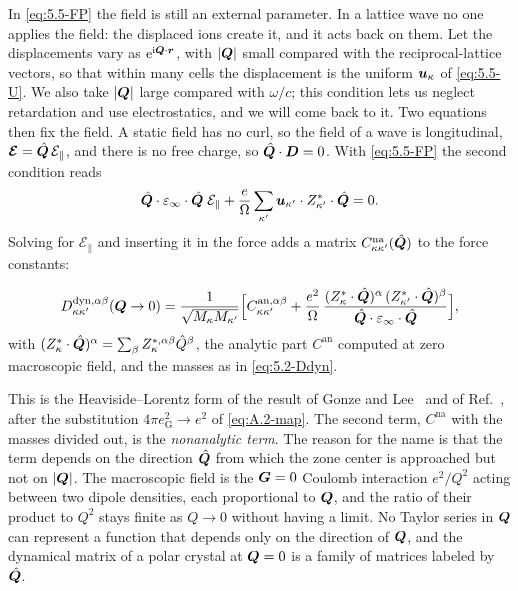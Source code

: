 In \cref{eq:5.5-FP} the field is still an external parameter. In a lattice wave no one applies the field: the displaced ions create it, and it acts back on them. Let the displacements vary as $\mathrm{e}^{\mathrm{i}\bm{Q}\cdot\bm{r}}$, with $|\bm{Q}|$ small compared with the reciprocal-lattice vectors, so that within many cells the displacement is the uniform $\bm{u}_\kappa$ of \cref{eq:5.5-U}. We also take $|\bm{Q}|$ large compared with $\omega/c$; this condition lets us neglect retardation and use electrostatics, and we will come back to it. Two equations then fix the field. A static field has no curl, so the field of a wave is longitudinal, $\bm{\mathcal{E}} = \hat{\bm{Q}}\,\mathcal{E}_\parallel$, and there is no free charge, so $\hat{\bm{Q}}\cdot\bm{D} = 0$. With \cref{eq:5.5-FP} the second condition reads
\begin{equation*}
  \hat{\bm{Q}}\cdot\varepsilon_\infty\cdot\hat{\bm{Q}}\;\mathcal{E}_\parallel + \frac{e}{\Omega}\sum_{\kappa'}\bm{u}_{\kappa'}\cdot Z^*_{\kappa'}\cdot\hat{\bm{Q}} = 0 .
\end{equation*}
Solving for $\mathcal{E}_\parallel$ and inserting it in the force adds a matrix $C^{\mathrm{na}}_{\kappa\kappa'}(\hat{\bm{Q}})$ to the force constants:
\begin{keyresult}
\begin{equation}
  D^{\mathrm{dyn},\alpha\beta}_{\kappa\kappa'}(\bm{Q}\to0) = \frac{1}{\sqrt{M_\kappa M_{\kappa'}}}\Bigl[C^{\mathrm{an},\alpha\beta}_{\kappa\kappa'} + \frac{e^2}{\Omega}\,\frac{(Z^*_\kappa\cdot\hat{\bm{Q}})^\alpha\,(Z^*_{\kappa'}\cdot\hat{\bm{Q}})^\beta}{\hat{\bm{Q}}\cdot\varepsilon_\infty\cdot\hat{\bm{Q}}}\Bigr] ,
  \label{eq:5.5-na}
\end{equation}
with $(Z^*_\kappa\cdot\hat{\bm{Q}})^\alpha = \sum_\beta Z^{*,\alpha\beta}_\kappa\hat Q^\beta$, the analytic part $C^{\mathrm{an}}$ computed at zero macroscopic field, and the masses as in \cref{eq:5.2-Ddyn}.
\end{keyresult}
This is the Heaviside--Lorentz form of the result of Gonze and Lee~\cite{gonze1997dynamical} and of Ref.~\cite[Eq.~(98)]{baroni2001phonons}, after the substitution $4\pi e^2_{\mathrm{G}} \to e^2$ of \cref{eq:A.2-map}. The second term, $C^{\mathrm{na}}$ with the masses divided out, is the \emph{nonanalytic term}. The reason for the name is that the term depends on the direction $\hat{\bm{Q}}$ from which the zone center is approached but not on $|\bm{Q}|$. The macroscopic field is the $\bm{G} = 0$ Coulomb interaction $e^2/Q^2$ acting between two dipole densities, each proportional to $\bm{Q}$, and the ratio of their product to $Q^2$ stays finite as $Q \to 0$ without having a limit. No Taylor series in $\bm{Q}$ can represent a function that depends only on the direction of $\bm{Q}$, and the dynamical matrix of a polar crystal at $\bm{Q} = 0$ is a family of matrices labeled by $\hat{\bm{Q}}$.

